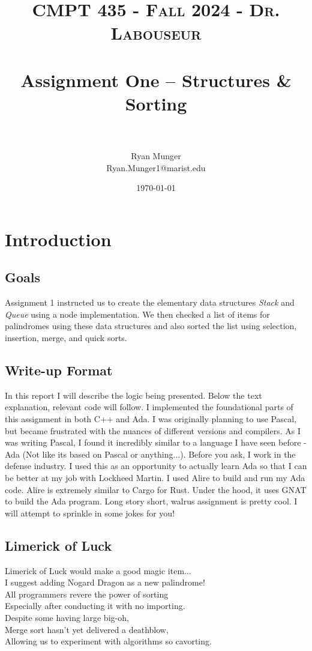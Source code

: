 \documentclass[letterpaper, 10pt]{article}
\title{	
   \normalfont \normalsize 
   \textsc{CMPT 435 - Fall 2024 - Dr. Labouseur} \\[10pt] %
   \horrule{0.5pt} \\[0.25cm] 	%
   \huge Assignment One -- Structures \& Sorting\\     	    %
   \horrule{0.5pt} \\[0.25cm] 	%
}
\author{Ryan Munger \\ \normalsize Ryan.Munger1@marist.edu}
\date{\normalsize\today} 	%
\begin{document}
\maketitle %


\section{Introduction}
\subsection{Goals}
Assignment 1 instructed us to create the elementary data structures \textit{Stack} and \textit{Queue} using a node implementation. We then checked a list of items for palindromes using these data structures and also sorted the list using selection, insertion, merge, and quick sorts.
\subsection{Write-up Format}
    In this report I will describe the logic being presented. Below the text explanation, relevant code will follow. I implemented the foundational parts of this assignment in both C++ and Ada. I was originally planning to use Pascal, but became frustrated with the nuances of different versions and compilers. As I was writing Pascal, I found it incredibly similar to a language I have seen before - Ada (Not like its based on Pascal or anything...). Before you ask, I work in the defense industry. I used this as an opportunity to actually learn Ada so that I can be better at my job with Lockheed Martin. I used Alire to build and run my Ada code. Alire is extremely similar to Cargo for Rust. Under the hood, it uses GNAT to build the Ada program. Long story short, walrus assignment is pretty cool. I will attempt to sprinkle in some jokes for you!
\subsection{Limerick of Luck}
Limerick of Luck would make a good magic item... \\
I suggest adding Nogard Dragon as a new palindrome! \\
\noindent
All programmers revere the power of sorting \\
Especially after conducting it with no importing. \\
    \hspace*{1.5em}Despite some having large big-oh, \\
    \hspace*{1.5em}Merge sort hasn't yet delivered a deathblow, \\
Allowing us to experiment with algorithms so cavorting. \\
\end{document}
